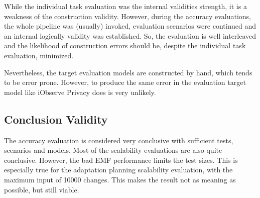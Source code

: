 While the individual task evaluation was the internal validities strength, it is a weakness of the construction validity. However, during the accuracy evaluations, the whole pipeline was (usually) invoked, evaluation scenarios were continued and an internal logically validity was established. So, the evaluation is well interleaved and the likelihood of construction errors should be, despite the individual task evaluation, minimized.

Nevertheless, the target evaluation models are constructed by hand, which tends to be error prone. However, to produce the same error in the evaluation target model like iObserve Privacy does is very unlikely.

\subsection{Conclusion Validity}

The accuracy evaluation is considered very conclusive with sufficient tests, scenarios and models. Most of the scalability evaluations are also quite conclusive. However, the bad EMF performance limits the test sizes. This is especially true for the adaptation planning scalability evaluation, with the maximum input of 10000 changes. This makes the result not as meaning as possible, but still viable.


